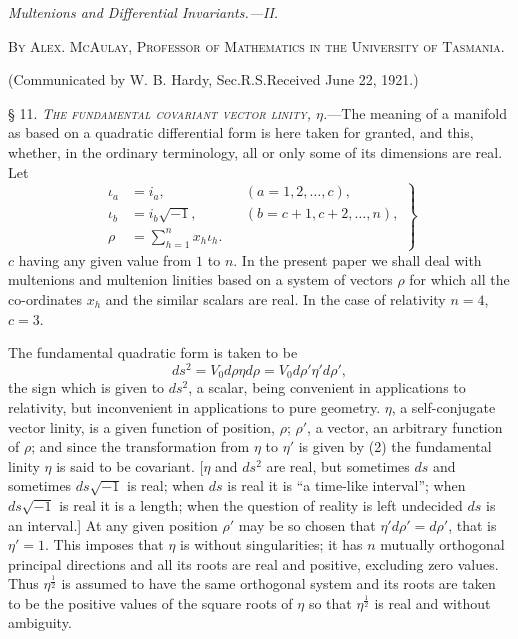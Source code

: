 \documentclass[11pt]{article}
\begin{document}
\thispagestyle{empty}

\begin{center}\textit{Multenions and Differential Invariants.---II.}\end{center}
\begin{center}\textsc{By Alex. McAulay, Professor of Mathematics in the University of Tasmania.}\end{center}
\begin{center}(Communicated by W. B. Hardy, Sec.R.S.\quad Received June 22, 1921.)\end{center}

\noindent\textsc{§ 11. \emph{The fundamental covariant vector linity, $\eta$.}}---The meaning of a manifold as based on a quadratic differential form is here taken for granted, and this, whether, in the ordinary terminology, all or only some of its dimensions are real. Let
\begin{equation}\left.\begin{aligned}
\iota_a&=i_a, &&(a=1,2,\ldots,c),\\
\iota_b&=i_b\sqrt{-1}, &&(b=c+1,c+2,\ldots,n),\\
\rho&=\sum_{h=1}^n x_h\iota_h.
\end{aligned}\right\}\tag{1}\end{equation}
$c$ having any given value from $1$ to $n$. In the present paper we shall deal with multenions and multenion linities based on a system of vectors $\rho$ for which all the co-ordinates $x_h$ and the similar scalars are real. In the case of relativity $n=4$, $c=3$.

\indent The fundamental quadratic form is taken to be
\begin{equation}ds^2=V_0d\rho\eta d\rho=V_0d\rho'\eta'd\rho',\tag{2}\end{equation}
the sign which is given to $ds^2$, a scalar, being convenient in applications to relativity, but inconvenient in applications to pure geometry. $\eta$, a self-conjugate vector linity, is a given function of position, $\rho$; $\rho'$, a vector, an arbitrary function of $\rho$; and since the transformation from $\eta$ to $\eta'$ is given by (2) the fundamental linity $\eta$ is said to be covariant. [$\eta$ and $ds^2$ are real, but sometimes $ds$ and sometimes $ds\sqrt{-1}$ is real; when $ds$ is real it is ``a time-like interval''; when $ds\sqrt{-1}$ is real it is a length; when the question of reality is left undecided $ds$ is an interval.] At any given position $\rho'$ may be so chosen that $\eta'd\rho'=d\rho'$, that is $\eta'=1$. This imposes that $\eta$ is without singularities; it has $n$ mutually orthogonal principal directions and all its roots are real and positive, excluding zero values. Thus $\eta^{\frac12}$ is assumed to have the same orthogonal system and its roots are taken to be the positive values of the square roots of $\eta$ so that $\eta^{\frac12}$ is real and without ambiguity.
\end{document}
